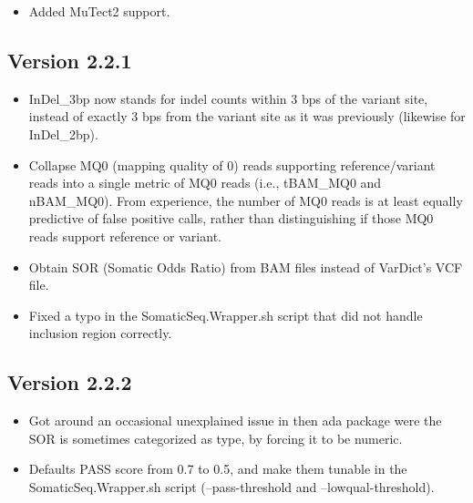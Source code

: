 \documentclass[10pt,letterpaper]{article}
\begin{document}
\begin{sloppypar}
\begin{itemize}

  \item
  Added MuTect2 support.

\end{itemize}



\subsection{Version 2.2.1}

\begin{itemize}

  \item
  InDel\_3bp now stands for indel counts within 3 bps of the variant site, instead of exactly 3 bps from the variant site as it was previously (likewise for InDel\_2bp). 
 
  \item
  Collapse MQ0 (mapping quality of 0) reads supporting reference/variant reads into a single metric of MQ0 reads (i.e., tBAM\_MQ0 and nBAM\_MQ0). From experience, the number of MQ0 reads is at least equally predictive of false positive calls, rather than distinguishing if those MQ0 reads support reference or variant. 
  
  \item
  Obtain SOR (Somatic Odds Ratio) from BAM files instead of VarDict's VCF file.
  
  \item
  Fixed a typo in the SomaticSeq.Wrapper.sh script that did not handle inclusion region correctly.
  
\end{itemize}



\subsection{Version 2.2.2}

\begin{itemize}

  \item
  Got around an occasional unexplained issue in then ada package were the SOR is sometimes categorized as type, by forcing it to be numeric. 
  
  \item
  Defaults PASS score from 0.7 to 0.5, and make them tunable in the SomaticSeq.Wrapper.sh script (--pass-threshold and --lowqual-threshold). 
  

\end{itemize}
\end{sloppypar}
\end{document}
